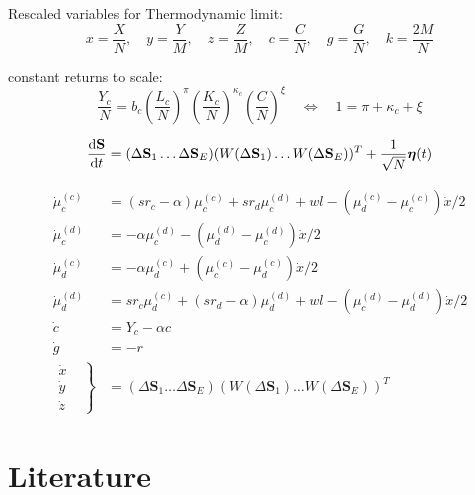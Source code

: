 Rescaled variables for Thermodynamic limit:
\begin{equation}
	x = \frac{X}{N}, \quad y = \frac{Y}{M}, \quad z = \frac{Z}{M}, \quad c = \frac{C}{N}, \quad g = \frac{G}{N}, \quad k = \frac{2M}{N}
\end{equation}

constant returns to scale:
\begin{equation}
	\frac{Y_c}{N} = b_c\left( \frac{L_c}{N} \right)^{\pi}\left( \frac{K_c}{N} \right)^{\kappa_c}\left( \frac{C}{N} \right)^{\xi} \quad \Leftrightarrow \quad 1 = \pi + \kappa_c + \xi
\end{equation}

\begin{equation}
	\frac{{\rm d} \mathbf{S} }{{\rm d} t} = (\Delta \mathbf{S}_1 \dots \Delta \mathbf{S}_E) (W(\Delta \mathbf{S}_1) \dots  W(\Delta \mathbf{S}_E))^{T} + \frac{1}{\sqrt{N}} \boldsymbol{\eta}(t)
\end{equation}

\begin{align}
	\dot{\mu}_c^{(c)} &= (sr_c - \alpha)\mu_c^{(c)} + s r_d \mu_c^{(d)} + w l - (\mu_d^{(c)} - \mu_c^{(c)})\dot{x}/2 \nonumber \\
	\dot{\mu}_c^{(d)} &= - \alpha\mu_c^{(d)} - (\mu_d^{(d)} - \mu_c^{(d)})\dot{x}/2\nonumber \\
	\dot{\mu}_d^{(c)} &= - \alpha\mu_d^{(c)} + (\mu_c^{(c)} - \mu_d^{(c)})\dot{x}/2\nonumber \\
	\dot{\mu}_d^{(d)} &= sr_c \mu_d^{(c)} + (s r_d - \alpha)\mu_d^{(d)} + w l - (\mu_c^{(d)} - \mu_d^{(d)})\dot{x}/2\nonumber \\
	\dot{c} &= Y_c - \alpha c\nonumber \\
	\dot{g} &= -r \nonumber \\
	\left. \begin{aligned} 
		\dot{x} & \\
		\dot{y} & \\
		\dot{z} & 
	\end{aligned} \right\} &=(\Delta \mathbf{S}_1 \dots \Delta \mathbf{S}_E) (W(\Delta \mathbf{S}_1) \dots  W(\Delta \mathbf{S}_E))^{T}
\end{align}


\section{Literature}

{}
    

